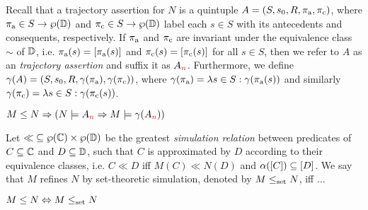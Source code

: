 Recall that a trajectory assertion for $N$ is a quintuple $A = (S, s_{0}, R, \operatorname{\pi_{\textrm{a}}}, \operatorname{\pi_{\textrm{c}}})$, where $\operatorname{\pi_{\textrm{a}}} \in S \rightarrow \wp(\mathbb{D})$ and $\operatorname{\pi_{\textrm{c}}} \in S \rightarrow \wp(\mathbb{D})$ label each $s \in S$ with its antecedents and consequents, respectively. If $\operatorname{\pi_{\textrm{a}}}$ and $\operatorname{\pi_{\textrm{c}}}$ are invariant under the equivalence class $\sim$ of $\mathbb{D}$, i.e. $\operatorname{\pi_{\textrm{a}}}(s) = [\operatorname{\pi_{\textrm{a}}}(s)]$ and $\operatorname{\pi_{\textrm{c}}}(s) = [\operatorname{\pi_{\textrm{c}}}(s)]$ for all $s \in S$, then we refer to $A$ as an \textit{ trajectory assertion} and suffix it as $A_{\textcolor{red}{n}}$. Furthermore, we define $\gamma(A) = (S, s_{0}, R, \gamma(\operatorname{\pi_{\textrm{a}}}), \gamma(\operatorname{\pi_{\textrm{c}}}))$, where $\gamma(\operatorname{\pi_{\textrm{a}}}) = \lambda s \in S : \gamma(\operatorname{\pi_{\textrm{a}}}(s))$ and similarly $\gamma(\operatorname{\pi_{\textrm{c}}}) = \lambda s \in S : \gamma(\operatorname{\pi_{\textrm{c}}}(s))$.
%
\begin{theorem} \label{thm:traj-refines}
$M \leq N \Rightarrow (N \models A_{\textcolor{red}{n}} \Rightarrow M \models \gamma(A_{\textcolor{red}{n}}))$
\end{theorem}

Let $\ll \; \subseteq \wp(\mathbb{C}) \times \wp(\mathbb{D})$ be the greatest \textit{simulation relation} between predicates of $C \subseteq \mathbb{C}$ and $D \subseteq \mathbb{D}$, such that $C$ is approximated by $D$ according to their equivalence classes, i.e. $C \ll D$ iff $M(C) \ll N(D)$ and $\alpha([C]) \subseteq [D]$. We say that $M$ refines $N$ by set-theoretic simulation, denoted by $M \leq_{\textrm{set}} N$, iff $\dots$
%
\begin{theorem} \label{thm:traj-equal-set}
$M \leq N \Leftrightarrow M \leq_{\textrm{set}} N$
\end{theorem}



